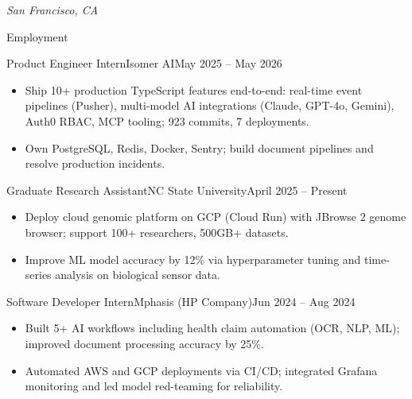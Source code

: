 \documentclass[]{mcdowellcv}
\begin{document}
\makeheader
\begin{center}\vspace{-12pt}\small\textit{San Francisco, CA}\end{center}\vspace{-10pt}

\begin{cvsection}{Employment}
  \begin{cvsubsection}{Product Engineer Intern}{Isomer AI}{May 2025 -- May 2026}
    \begin{itemize}
      \item Ship 10+ production TypeScript features end-to-end: real-time event pipelines (Pusher), multi-model AI integrations (Claude, GPT-4o, Gemini), Auth0 RBAC, MCP tooling; 923 commits, 7 deployments.
      \item Own PostgreSQL, Redis, Docker, Sentry; build document pipelines and resolve production incidents.
    \end{itemize}
    \vspace{-1.5pt}
  \end{cvsubsection}

  \begin{cvsubsection}{Graduate Research Assistant}{NC State University}{April 2025 -- Present}
    \begin{itemize}
      \item Deploy cloud genomic platform on GCP (Cloud Run) with JBrowse 2 genome browser; support 100+ researchers, 500GB+ datasets.
      \item Improve ML model accuracy by 12\% via hyperparameter tuning and time-series analysis on biological sensor data.
    \end{itemize}
    \vspace{-1.5pt}
  \end{cvsubsection}

  \begin{cvsubsection}{Software Developer Intern}{Mphasis (HP Company)}{Jun 2024 -- Aug 2024}
    \begin{itemize}
      \item Built 5+ AI workflows including health claim automation (OCR, NLP, ML); improved document processing accuracy by 25\%.
      \item Automated AWS and GCP deployments via CI/CD; integrated Grafana monitoring and led model red-teaming for reliability.
    \end{itemize}
    \vspace{-1.5pt}
  \end{cvsubsection}


\end{cvsection}
\end{document}
